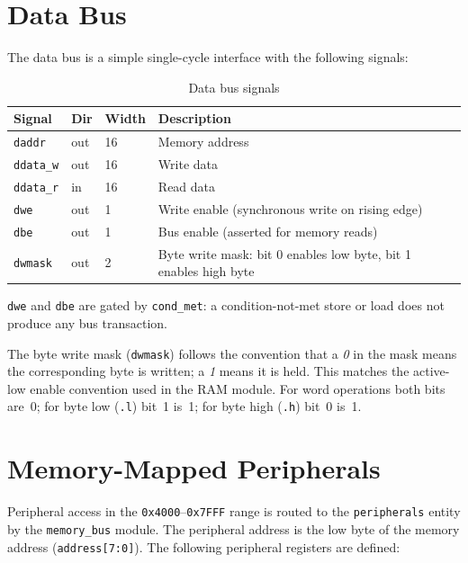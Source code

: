 \documentclass[a4paper,12pt]{report}
\newcommand{\asm}[1]{\texttt{#1}}
\newcommand{\field}[1]{\texttt{\small #1}}
\newcommand{\signal}[1]{\texttt{#1}}
\begin{document}
\section{Data Bus}

The data bus is a simple single-cycle interface with the following signals:

\begin{table}[htbp]
\centering
\caption{Data bus signals}
\begin{tabularx}{\textwidth}{lllX}
    \toprule
    \textbf{Signal} & \textbf{Dir} & \textbf{Width} & \textbf{Description} \\
    \midrule
    \signal{daddr}   & out & 16 & Memory address \\
    \signal{ddata\_w} & out & 16 & Write data \\
    \signal{ddata\_r} & in  & 16 & Read data \\
    \signal{dwe}     & out &  1 & Write enable (synchronous write on rising edge) \\
    \signal{dbe}     & out &  1 & Bus enable (asserted for memory reads) \\
    \signal{dwmask}  & out &  2 & Byte write mask: bit 0 enables low byte, bit 1 enables high byte \\
    \bottomrule
\end{tabularx}
\end{table}

\signal{dwe} and \signal{dbe} are gated by \field{cond\_met}: a condition-not-met store or load does not produce any bus transaction.

The byte write mask (\signal{dwmask}) follows the convention that a \emph{0} in the mask means the corresponding byte is written; a \emph{1} means it is held. This matches the active-low enable convention used in the RAM module. For word operations both bits are~0; for byte low (\asm{.l}) bit~1 is~1; for byte high (\asm{.h}) bit~0 is~1.

\section{Memory-Mapped Peripherals}

Peripheral access in the \texttt{0x4000}--\texttt{0x7FFF} range is routed to the \texttt{peripherals} entity by the \texttt{memory\_bus} module. The peripheral address is the low byte of the memory address (\signal{address[7:0]}). The following peripheral registers are defined:
\end{document}
